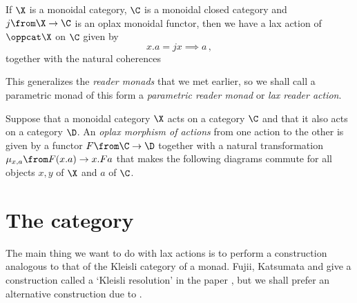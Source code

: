 \begin{example}
  If $\X$ is a monoidal category, $\C$ is a monoidal closed category and $j\from \X \to \C$ is an oplax monoidal functor, then we have a lax action of $\oppcat\X$ on $\C$ given by
  \[
    x.a = jx \implies a\,,
    \]
  together with the natural coherences
  This generalizes the \emph{reader monads} that we met earlier, so we shall call a parametric monad of this form a \emph{parametric reader monad} or \emph{lax reader action}.
\end{example}

\begin{definition}
  \label{DefOplaxMorphismOfActions}
  Suppose that a monoidal category $\X$ acts on a category $\C$ and that it also acts on a category $\D$.  
  An \emph{oplax morphism of actions} from one action to the other is given by a functor $F \from \C \to \D$ together with a natural transformation $\mu_{x,a} \from F(x.a) \to x.Fa$ that makes the following diagrams commute for all objects $x,y$ of $\X$ and $a$ of $\C$.
\end{definition}

\section{The \Mellies category}

The main thing we want to do with lax actions is to perform a construction analogous to that of the Kleisli category of a monad.  
Fujii, Katsumata and \Mellies give a construction called a `Kleisli resolution' in the paper \cite{KleisliResolution}, but we shall prefer an alternative construction due to \Mellies.


